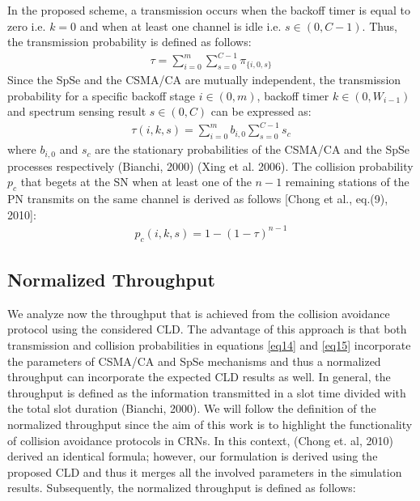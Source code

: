 \documentclass
[journal,11pt,draftclsnofoot,onecolumn,doublespace]{tETN2e}
\begin{document}
In the proposed scheme, a transmission occurs when the backoff timer is equal to zero i.e. $k=0$ and when at least one channel is idle i.e. $s\in(0,C-1)$. Thus, the transmission probability is defined as follows: 
\begin{eqnarray} \label{eq13}
 \tau = \sum_{i=0}^m \sum_{s=0}^{C-1} \pi_{\lbrace i,0,s \rbrace}
\end{eqnarray}
Since the SpSe and the CSMA/CA are mutually independent, the transmission
probability for a specific backoff stage $i\in(0,m)$, backoff timer $k\in(0,W_{i-1})$ and spectrum sensing result $s\in(0,C)$ can be expressed as: 
\begin{eqnarray} \label{eq14}
 \tau(i,k,s) = \sum_{i=0}^m b_{i,0} \sum_{s=0}^{C-1} s_c
\end{eqnarray}
where $b_{i,0}$ and $s_c$ are the stationary probabilities of the CSMA/CA and the SpSe processes respectively (Bianchi, 2000) (Xing et al. 2006). The collision probability $p_c$ that begets at the SN when at least one of the $n - 1$ remaining stations of the PN transmits on the same channel is derived as follows [Chong et al., eq.(9), 2010]: 
\begin{eqnarray} \label{eq15}
 p_c(i,k,s) = 1-(1-\tau)^{n-1}
\end{eqnarray}

\subsection{Normalized Throughput}

We analyze now the throughput that is achieved from the collision avoidance protocol using the considered CLD. The advantage of this approach is that both transmission and collision probabilities in equations \eqref{eq14} and \eqref{eq15} incorporate the parameters of CSMA/CA and SpSe mechanisms and thus a normalized throughput can incorporate the expected CLD results as well. In general, the throughput is defined as the information transmitted in a slot time divided with the total slot duration (Bianchi, 2000). We will follow the definition of the normalized throughput since the aim of this work is to highlight the functionality of collision avoidance protocols in CRNs. In this context, (Chong et. al, 2010) derived an identical formula; however, our formulation is derived using the proposed CLD and thus it merges all the involved parameters in the simulation results. Subsequently, the normalized throughput is defined as follows: 
\end{document}
